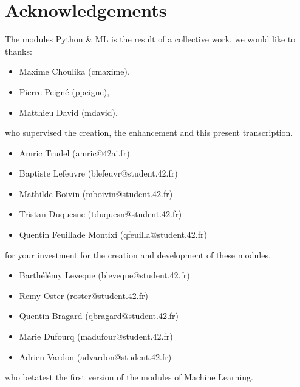 \documentclass{42-en}
\begin{document}
\section*{Acknowledgements}
The modules Python \& ML is the result of a collective work, we would like to thanks:
\begin{itemize}
  \item Maxime Choulika (cmaxime),
  \item Pierre Peigné (ppeigne),
  \item Matthieu David (mdavid).
\end{itemize}
who supervised the creation, the enhancement and this present transcription.

\begin{itemize}
    \item Amric Trudel (amric@42ai.fr)
    \item Baptiste Lefeuvre (blefeuvr@student.42.fr)
    \item Mathilde Boivin (mboivin@student.42.fr)
    \item Tristan Duquesne (tduquesn@student.42.fr)
    \item Quentin Feuillade Montixi (qfeuilla@student.42.fr)
\end{itemize}
for your investment for the creation and development of these modules.

\begin{itemize}
    \item Barthélémy Leveque (bleveque@student.42.fr)
    \item Remy Oster (roster@student.42.fr)
    \item Quentin Bragard (qbragard@student.42.fr)
    \item Marie Dufourq (madufour@student.42.fr)
    \item Adrien Vardon (advardon@student.42.fr)
\end{itemize}
who betatest the first version of the modules of Machine Learning.
\vfill
\doclicenseThis
\end{document}
